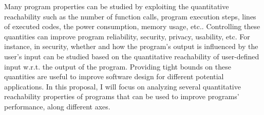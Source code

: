  

Many program properties can be 
studied by exploiting the quantitative reachability
such as the number of function calls,
program execution steps,
lines of executed codes,
the power consumption, memory usage, etc.. 
Controlling these quantities can improve program reliability, security, privacy, usability, etc.
 For instance, in security, whether and how the program's output is influenced by the user's input
 can be studied based on the 
 quantitative reachability
 of user-defined input w.r.t. the output of the program.
Providing tight bounds on these quantities are useful to improve software design for different potential applications. In this proposal, I will focus on analyzing several quantitative reachability properties of programs that can be used to improve programs' performance, along different axes.

